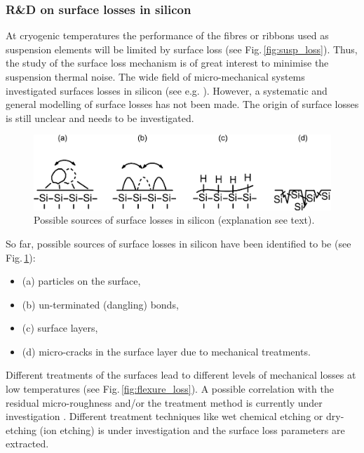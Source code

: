\FloatBarrier
\subsubsection{R\&D on surface losses in silicon}
\label{sec:si_surface_loss}

At cryogenic temperatures the performance of the fibres or  ribbons used as suspension elements will be limited by surface loss (see Fig.\,\ref{fig:susp_loss}). Thus, the study of  the surface loss mechanism is of great interest to minimise the suspension thermal noise.
The wide field of micro-mechanical systems investigated surfaces losses in silicon (see e.g. \cite{Yang2000,Yasumura2000,Yang2002}). However, a systematic and general modelling of surface losses has not been made. The origin of surface losses is still unclear and needs to be investigated.

\begin{figure}[htbp]
\begin{center}
\includegraphics[width=0.75\linewidth]{Sec_Suspensions/Figures/surface_loss.pdf}
\caption{Possible sources of surface losses in silicon (explanation see text).}
\label{fig:surf_loss}
\end{center}
\end{figure}

So far, possible sources of surface losses in silicon have been identified to be (see Fig.\,\ref{fig:surf_loss}):

\begin{itemize}
\item (a) particles on the surface,
\item (b) un-terminated (dangling) bonds,
\item (c) surface layers,
\item (d) micro-cracks in the surface layer due to mechanical treatments.
\end{itemize}

Different treatments of the surfaces lead to different levels of mechanical losses at low temperatures (see Fig.\,\ref{fig:flexure_loss}). A possible correlation with the residual micro-roughness and/or the treatment method is currently under investigation \cite{Nawrodt_2010_arXiv}. Different treatment techniques like wet chemical etching or dry-etching (ion etching) is under investigation and the surface loss parameters are extracted.

